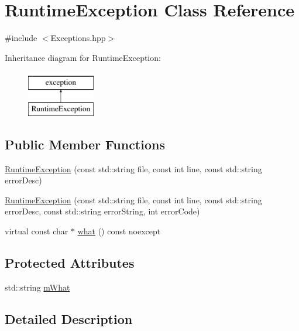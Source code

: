 \hypertarget{class_runtime_exception}{\section{Runtime\-Exception Class Reference}
\label{class_runtime_exception}
}


{\ttfamily \#include $<$Exceptions.\-hpp$>$}

Inheritance diagram for Runtime\-Exception\-:\begin{figure}[H]
\begin{center}
\leavevmode
\includegraphics[height=2.000000cm]{class_runtime_exception}
\end{center}
\end{figure}
\subsection*{Public Member Functions}
\begin{DoxyCompactItemize}
\item 
\hyperlink{class_runtime_exception_a74daf11dd2d8f27ce31eb1a20c4bb51d}{Runtime\-Exception} (const std\-::string file, const int line, const std\-::string error\-Desc)
\item 
\hyperlink{class_runtime_exception_a16f5815dc82b7555e90f00a0f903931a}{Runtime\-Exception} (const std\-::string file, const int line, const std\-::string error\-Desc, const std\-::string error\-String, int error\-Code)
\item 
virtual const char $\ast$ \hyperlink{class_runtime_exception_af4bfdc4ed954aada1cee8da317a60a74}{what} () const noexcept
\end{DoxyCompactItemize}
\subsection*{Protected Attributes}
\begin{DoxyCompactItemize}
\item 
std\-::string \hyperlink{class_runtime_exception_a5e945378f1f675427e50ab1f17e0a0f2}{m\-What}
\end{DoxyCompactItemize}


\subsection{Detailed Description}


